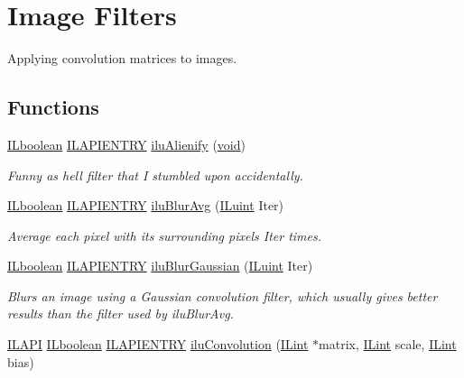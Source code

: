 \hypertarget{group__ilu__filter}{\section{Image Filters}
\label{group__ilu__filter}
}


Applying convolution matrices to images.  


\subsection*{Functions}
\begin{DoxyCompactItemize}
\item 
\hyperlink{group__il__types_gaa6aa7c95cfdc06b4d8601ef832b7bb0a}{I\+Lboolean} \hyperlink{_i_l_8h_a69c08a8d06df986f7e46f209d131ef2f}{I\+L\+A\+P\+I\+E\+N\+T\+R\+Y} \hyperlink{group__ilu__filter_gacb6e1a0e8dc10748f1cfbf60b1f8c350}{ilu\+Alienify} (\hyperlink{_i_l_8h_a5530e04d947bcddd83639ea7940faf10}{void})
\begin{DoxyCompactList}\small\item\em Funny as hell filter that I stumbled upon accidentally. \end{DoxyCompactList}\item 
\hyperlink{group__il__types_gaa6aa7c95cfdc06b4d8601ef832b7bb0a}{I\+Lboolean} \hyperlink{_i_l_8h_a69c08a8d06df986f7e46f209d131ef2f}{I\+L\+A\+P\+I\+E\+N\+T\+R\+Y} \hyperlink{group__ilu__filter_ga017478330f243e5bb6e6edc29cdf1f37}{ilu\+Blur\+Avg} (\hyperlink{group__il__types_gaff8e86a1072c8d7cfe387fb87c6ed8e1}{I\+Luint} Iter)
\begin{DoxyCompactList}\small\item\em Average each pixel with its surrounding pixels {\itshape Iter} times. \end{DoxyCompactList}\item 
\hyperlink{group__il__types_gaa6aa7c95cfdc06b4d8601ef832b7bb0a}{I\+Lboolean} \hyperlink{_i_l_8h_a69c08a8d06df986f7e46f209d131ef2f}{I\+L\+A\+P\+I\+E\+N\+T\+R\+Y} \hyperlink{group__ilu__filter_ga4163c484488b3afc352e3ed6c768babf}{ilu\+Blur\+Gaussian} (\hyperlink{group__il__types_gaff8e86a1072c8d7cfe387fb87c6ed8e1}{I\+Luint} Iter)
\begin{DoxyCompactList}\small\item\em Blurs an image using a Gaussian convolution filter, which usually gives better results than the filter used by ilu\+Blur\+Avg. \end{DoxyCompactList}\item 
\hyperlink{_i_l_8h_aedb0c8b2b033d0612e3d784d2f598758}{I\+L\+A\+P\+I} \hyperlink{group__il__types_gaa6aa7c95cfdc06b4d8601ef832b7bb0a}{I\+Lboolean} \hyperlink{_i_l_8h_a69c08a8d06df986f7e46f209d131ef2f}{I\+L\+A\+P\+I\+E\+N\+T\+R\+Y} \hyperlink{group__ilu__filter_gaeb5bb85ceb172bd9742f7f0730a1d440}{ilu\+Convolution} (\hyperlink{group__il__types_ga8effe51a00daaa0878631e5af75a36cb}{I\+Lint} $\ast$matrix, \hyperlink{group__il__types_ga8effe51a00daaa0878631e5af75a36cb}{I\+Lint} scale, \hyperlink{group__il__types_ga8effe51a00daaa0878631e5af75a36cb}{I\+Lint} bias)

\end{DoxyCompactItemize}
